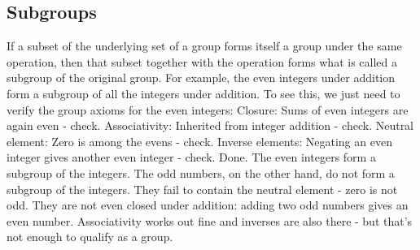 









\subsection{Subgroups}


If a subset of the underlying set of a group forms itself a group under the same operation, then that subset together with the operation forms what is called a subgroup of the original group. For example, the even integers under addition form a subgroup of all the integers under addition. To see this, we just need to verify the group axioms for the even integers: Closure: Sums of even integers are again even - check. Associativity: Inherited from integer addition - check. Neutral element: Zero is among the evens - check. Inverse elements: Negating an even integer gives another even integer - check. Done. The even integers form a subgroup of the integers. The odd numbers, on the other hand, do not form a subgroup of the integers. They fail to contain the neutral element - zero is not odd. They are not even closed under addition: adding two odd numbers gives an even number. Associativity works out fine and inverses are also there - but that's not enough to qualify as a group. 

